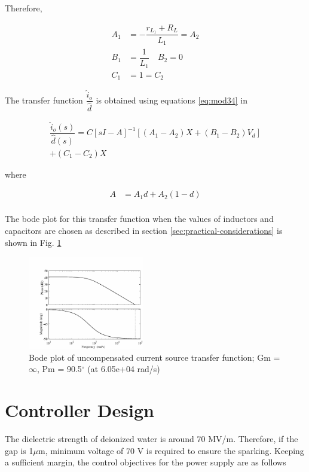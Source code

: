 \documentclass[a4paper]{IEEEtran}
\begin{document}
	Therefore,
	
	\begin{equation}
		\begin{split}
			A_1 &= -\dfrac{r_{L_1}+R_L}{L_1} = A_2\\
			B_1 &= \dfrac{1}{L_1} \quad B_2 = 0\\
			C_1 &= 1 = C_2
		\end{split}
		\label{eq:mod34}
	\end{equation}
	
	The transfer function $\dfrac{\hat{i}_o}{\hat{d}}$ is obtained using equations \eqref{eq:mod34} in 
	
	\begin{multline}
		\dfrac{\hat{i}_o(s)}{\hat{d}(s)} = C[sI-A]^{-1}[(A_1-A_2)X+(B_1-B_2)V_d]\\+(C_1-C_2)X
		\label{eq:mod35}
	\end{multline}
	
	where
	
	\begin{align}
		A &= A_1d+A_2(1-d)\\
		\label{eq:mod36}
	\end{align}

	The bode plot for this transfer function when the values of inductors and capacitors are chosen as described in section \ref{sec:practical-considerations} is shown in Fig. \ref{fig:uncomp-cs}

	\begin{figure}
		\centering
		\includegraphics[width=0.45\textwidth]{uncompensated-cs}
		\caption{Bode plot of uncompensated current source transfer function; Gm = $\infty$,  Pm = 90.5$^\circ$ (at 6.05e+04 rad/s)}
		\label{fig:uncomp-cs}
	\end{figure}

\section{Controller Design}
	The dielectric strength of deionized water is around 70 MV/m. Therefore, if the gap is 1$\mu$m, minimum voltage of 70 V is required to ensure the sparking. Keeping a sufficient margin, the control objectives for the power supply are as follows
	
\end{document}
